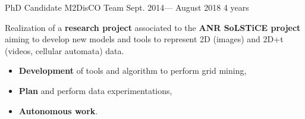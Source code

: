 \jobposition%
{PhD Candidate}%
{M2DisCO Team}
{Sept. 2014--- August 2018}%
{4 years}%
{
	Realization of a \textbf{research project} associated to the
	\textbf{ANR SoLSTiCE project} aiming to develop new models and tools to
	represent 2D (images) and 2D+t (videos, cellular automata) data.
	\vspace{0.5em}
	\begin{itemize}
		\item \textbf{Development} of tools and algorithm to perform grid mining,
		\item \textbf{Plan} and perform data experimentations,
		\item \textbf{Autonomous work}.
	\end{itemize}
	\vspace{0.5em}

}
